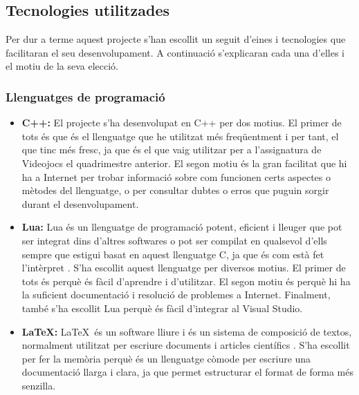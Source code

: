 \documentclass[a4paper]{article}
\begin{document}
\subsection{Tecnologies utilitzades}
Per dur a terme aquest projecte s'han escollit un seguit d'eines i tecnologies que facilitaran el seu desenvolupament. A continuació s'explicaran cada una d'elles i el motiu de la seva elecció.

\subsubsection{Llenguatges de programació}
\begin{itemize}
    \item \textbf{C++:} El projecte s'ha desenvolupat en C++ per dos motius. El primer de tots és que és el llenguatge que he utilitzat més freqüentment i per tant, el que tinc més fresc, ja que és el que vaig utilitzar per a l'assignatura de Videojocs el quadrimestre anterior. El segon motiu és la gran facilitat que hi ha a Internet per trobar informació sobre com funcionen certs aspectes o mètodes del llenguatge, o per consultar dubtes o erros que puguin sorgir durant el desenvolupament. 
    \item \textbf{Lua:} Lua és un llenguatge de programació potent, eficient i lleuger que pot ser integrat dins d'altres softwares o pot ser compilat en qualsevol d'ells sempre que estigui basat en aquest llenguatge C, ja que és com està fet l'intèrpret \cite{luaAbout}. S'ha escollit aquest llenguatge per diversos motius. El primer de tots és perquè és fàcil d'aprendre i d'utilitzar. El segon motiu és perquè hi ha la suficient documentació i resolució de problemes a Internet. Finalment, també s'ha escollit Lua perquè és fàcil d'integrar al Visual Studio.
    \item \textbf{\LaTeX:} \LaTeX \, és un software lliure i és un sistema de composició de textos, normalment utilitzat per escriure documents i articles científics \cite{wikipediaLatex}. S'ha escollit per fer la memòria perquè és un llenguatge còmode per escriure una documentació llarga i clara, ja que permet estructurar el format de forma més senzilla.
\end{itemize}
\end{document}
